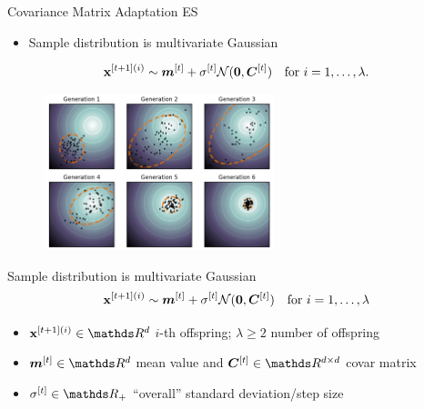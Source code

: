 \documentclass[11pt,compress,t,notes=noshow, xcolor=table]{beamer}
\begin{document}
\begin{vbframe}{Covariance Matrix Adaptation ES}


\begin{itemize}
 \item Sample distribution is multivariate Gaussian
\end{itemize}

\vspace{-10pt}

\begin{eqnarray*}
\mathbf{x}^{[t+1](i)} \sim \bm{m}^{[t]} + \sigma^{[t]} \mathcal{N} (\bm{0}, \bm{C}^{[t]}) \quad \text{for } i = 1, \dots, \lambda.
\end{eqnarray*}
\vspace{-20pt}

\begin{figure}
  \includegraphics[width=0.6\textwidth, height=0.45\textheight]{figure_man/cmaes/cmaes_generations.png}
\end{figure}

\framebreak
Sample distribution is multivariate Gaussian
$$
\mathbf{x}^{[t+1](i)} \sim \bm{m}^{[t]} + \sigma^{[t]} \mathcal{N} (\bm{0}, \bm{C}^{[t]}) \quad \text{for } i = 1, \dots, \lambda
$$
\vspace{-20pt}
\begin{itemize}
\item $\xv^{[t+1](i)} \in \R^d$ $i$-th offspring; $\lambda \geq 2$ number of offspring
\item $\bm{m}^{[t]} \in \R^d$ mean value and $\bm{C}^{[t]} \in \R^{d \times d}$ covar matrix
\item $\sigma^{[t]} \in \R_{+}$ \enquote{overall} standard deviation/step size
\end{itemize}


\end{vbframe}
\end{document}
